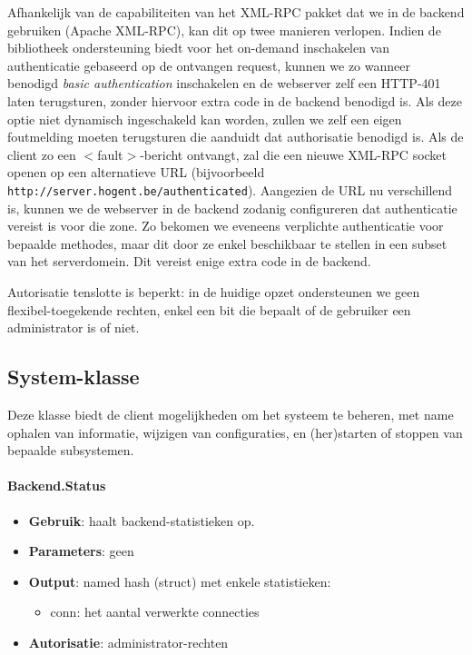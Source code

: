Afhankelijk van de capabiliteiten van het XML-RPC pakket dat we in de backend gebruiken (Apache XML-RPC), kan dit op twee manieren verlopen. Indien de bibliotheek ondersteuning biedt voor het on-demand inschakelen van authenticatie gebaseerd op de ontvangen request, kunnen we zo wanneer benodigd \emph{basic authentication} inschakelen en de webserver zelf een HTTP-401 laten terugsturen, zonder hiervoor extra code in de backend benodigd is.
Als deze optie niet dynamisch ingeschakeld kan worden, zullen we zelf een eigen foutmelding moeten terugsturen die aanduidt dat authorisatie benodigd is. Als de client zo een $<$fault$>$-bericht ontvangt, zal die een nieuwe XML-RPC socket openen op een alternatieve URL (bijvoorbeeld \texttt{http://server.hogent.be/authenticated}). Aangezien de URL nu verschillend is, kunnen we de webserver in de backend zodanig configureren dat authenticatie vereist is voor die zone. Zo bekomen we eveneens verplichte authenticatie voor bepaalde methodes, maar dit door ze enkel beschikbaar te stellen in een subset van het serverdomein. Dit vereist enige extra code in de backend.

Autorisatie tenslotte is beperkt: in de huidige opzet ondersteunen we geen flexibel-toegekende rechten, enkel een bit die bepaalt of de gebruiker een administrator is of niet.

\subsection{System-klasse}

Deze klasse biedt de client mogelijkheden om het systeem te beheren, met name ophalen van informatie, wijzigen van configuraties, en (her)starten of stoppen van bepaalde subsystemen.

\paragraph{Backend.Status}
\begin{itemize}
\item{\textbf{Gebruik}: haalt backend-statistieken op.}
\item{\textbf{Parameters}: geen}
\item{\textbf{Output}: named hash (struct) met enkele statistieken:}
	\begin{itemize}
	\item{conn: het aantal verwerkte connecties}
	\end{itemize}
\item{\textbf{Autorisatie}: administrator-rechten}
\end{itemize}

